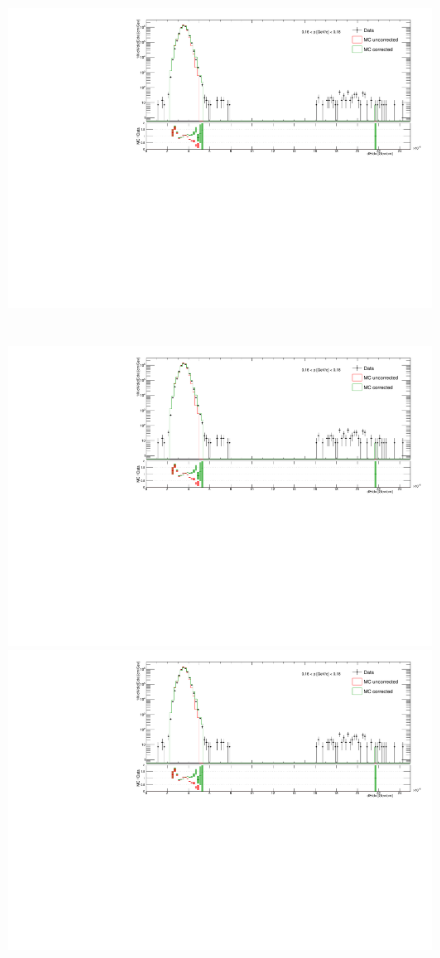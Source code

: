 \begin{figure}[hb]
{  \includegraphics[width=\linewidth,page=34]{graphics/dedx/dEdx_DataVsMC.pdf}
}~
\parbox{0.495\textwidth}{
  \centering
  \includegraphics[width=\linewidth,page=9]{graphics/dedx/dEdx_DataVsMC.pdf}\\
  \includegraphics[width=\linewidth,page=19]{graphics/dedx/dEdx_DataVsMC.pdf}\\
}
\end{figure}
